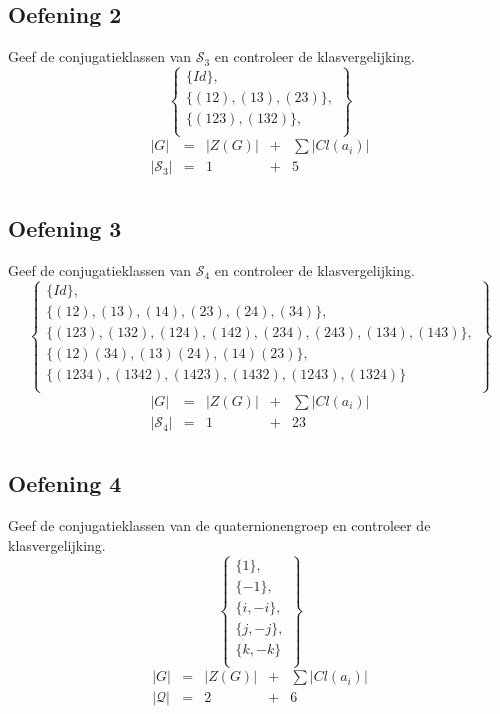 \documentclass[main.tex]{subfiles}
\begin{document}
\subsection*{Oefening 2}
\label{sec:oz3-oef2}
Geef de conjugatieklassen van $\mathcal{S}_{3}$ en controleer de klasvergelijking.
\[ 
\left\{ 
  \begin{array}{c}
\{ Id \},\\
\{ (12),(13),(23) \},\\
\{ (123),(132) \},\\
\end{array}
\right\}
\]
\[
\begin{array}{ccccc}
  |G| &=& |Z(G)| &+& \sum|Cl(a_{i})|\\
  |\mathcal{S}_{3}| &=& 1 &+& 5\\
\end{array}
\]


\subsection*{Oefening 3}
\label{sec:oz3-oef2}
Geef de conjugatieklassen van $\mathcal{S}_{4}$ en controleer de klasvergelijking.
\[ 
\left\{ 
  \begin{array}{c}
\{ Id \},\\
\{ (12),(13),(14),(23),(24),(34) \},\\
\{ (123),(132),(124),(142),(234),(243),(134),(143) \},\\
\{ (12)(34),(13)(24),(14)(23) \},\\
\{ (1234),(1342),(1423),(1432),(1243),(1324) \}\\
\end{array}
\right\}
\]
\[
\begin{array}{ccccc}
  |G| &=& |Z(G)| &+& \sum|Cl(a_{i})|\\
  |\mathcal{S}_{4}| &=& 1 &+& 23\\
\end{array}
\]

\subsection*{Oefening 4}
\label{sec:oz3-oef3}
Geef de conjugatieklassen van de quaternionengroep en controleer de klasvergelijking.
\[ 
\left\{ 
  \begin{array}{c}
\{ 1 \},\\
\{ -1 \},\\
\{ i,-i \},\\
\{ j,-j \},\\
\{ k,-k \}\\
\end{array}
\right\}
\]
\[
\begin{array}{ccccc}
  |G| &=& |Z(G)| &+& \sum|Cl(a_{i})|\\
  |\mathcal{Q}| &=& 2 &+& 6\\
\end{array}
\]
\end{document}
